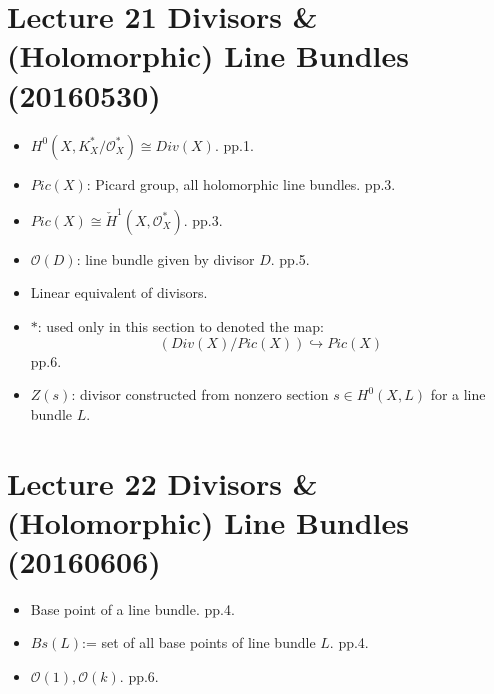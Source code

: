 \section{Lecture 21 Divisors \& (Holomorphic) Line Bundles  (20160530)}
\begin{itemize}
    \item $H^0(X,K^*_X/\mathcal{O}^*_X) \cong Div(X)$. pp.1.
    \item $Pic(X)$: Picard group, all holomorphic line bundles. pp.3.
    \item $Pic(X) \cong \check{H}^1(X,\mathcal{O}^*_X)$. pp.3.
    \item $\mathcal{O}(D)$: line bundle given by divisor $D$. pp.5.
    \item Linear equivalent of divisors.
    \item $*$: used only in this section to denoted the map:
    $$\left( Div(X)/Pic(X) \right) \hookrightarrow Pic(X)$$
    pp.6.
    \item $Z(s)$: divisor constructed from nonzero section $s\in H^0(X,L)$ for a line bundle $L$.
\end{itemize}

\section{Lecture 22 Divisors \& (Holomorphic) Line Bundles (20160606)}
\begin{itemize}
    \item Base point of a line bundle. pp.4.
    \item $Bs(L)$:= set of all base points of line bundle $L$. pp.4.
    \item $\mathcal{O}(1), \mathcal{O}(k)$. pp.6.
\end{itemize}

